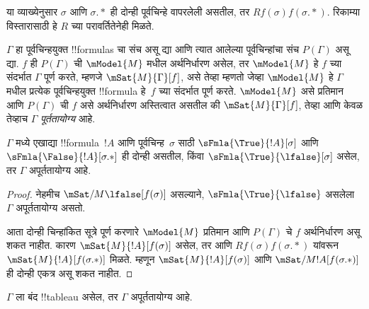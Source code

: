\documentclass[../../../include/open-logic-section]{subfiles}
\begin{document}
या व्याख्येनुसार $\sigma$ आणि $\sigma.{*}$ ही दोन्ही
पूर्वचिन्हे वापरलेली असतील, तर $Rf(\sigma)f(\sigma.{*})$.
रिकाम्या विस्तारासाठी हे $R$ च्या परावर्तितेनेही मिळते.

\begin{defn}
  $\Gamma$ हा पूर्वचिन्हयुक्त !!{formula}s
  चा संच असू द्या आणि त्यात आलेल्या
  पूर्वचिन्हांचा संच $P(\Gamma)$ असू द्या.
  $f$ ही $P(\Gamma)$ ची
  $\mModel{M}$ मधील अर्थनिर्धारण
  असेल, तर $\mModel{M}$ हे
  $f$ च्या संदर्भात $\Gamma$
  पूर्ण करते, म्हणजे
  $\mSat{M}{\Gamma}[f]$, असे
  तेव्हा म्हणतो जेव्हा
  $\mModel{M}$ हे $\Gamma$ मधील
  प्रत्येक पूर्वचिन्हयुक्त
  !!{formula} हे~$f$ च्या संदर्भात
  पूर्ण करते. $\mModel{M}$ असे
  प्रतिमान आणि $P(\Gamma)$ ची
  $f$ असे अर्थनिर्धारण अस्तित्वात
  असतील की $\mSat{M}{\Gamma}[f]$,
  तेव्हा आणि केवळ तेव्हाच $\Gamma$ \emph{पूर्ततायोग्य}
  आहे.
\end{defn}

\begin{prop}
  $\Gamma$ मध्ये एखाद्या
  !!{formula}~$!A$ आणि पूर्वचिन्ह~$\sigma$
  साठी $\sFmla{\True}{!A}[\sigma]$ आणि
  $\sFmla{\False}{!A}[\sigma.{*}]$
  ही दोन्ही असतील, किंवा
  $\sFmla{\True}{\lfalse}[\sigma]$
  असेल, तर $\Gamma$ अपूर्ततायोग्य आहे.
\end{prop}

\begin{proof}
  नेहमीच $\mSat/{M}{\lfalse}[f(\sigma)]$
  असल्याने, $\sFmla{\True}{\lfalse}$
  असलेला $\Gamma$ अपूर्ततायोग्य असतो.

  आता दोन्ही चिन्हांकित सूत्रे पूर्ण
  करणारे $\mModel{M}$ प्रतिमान आणि
  $P(\Gamma)$ चे $f$ अर्थनिर्धारण
  असू शकत नाहीत. कारण
  $\mSat{M}{!A}[f(\sigma)]$
  असेल, तर
  आणि $Rf(\sigma)f(\sigma.{*})$
  यांवरून
  $\mSat{M}{!A}[f(\sigma.{*})]$
  मिळते. म्हणून
  $\mSat{M}{!A}[f(\sigma)]$ आणि
  $\mSat/{M}{!A}[f(\sigma.{*})]$
  ही दोन्ही एकत्र असू शकत नाहीत.
\end{proof}

\begin{thm}[निर्दोषता]
  $\Gamma$ ला बंद !!{tableau}
  असेल, तर $\Gamma$ अपूर्ततायोग्य
  आहे.
\end{thm}
\end{document}

